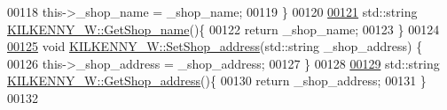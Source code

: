 \begin{DoxyCode}
00118     this->\_shop\_name = \_shop\_name;
00119 \}
00120 
\hypertarget{_k_i_l_k_e_n_n_y___w_8cpp_source.tex_l00121}{}\hyperlink{class_k_i_l_k_e_n_n_y___w_a93dac05f03edc97797f89501aa2af73a}{00121} std::string \hyperlink{class_k_i_l_k_e_n_n_y___w_a93dac05f03edc97797f89501aa2af73a}{KILKENNY\_W::GetShop\_name}()\{
00122     \textcolor{keywordflow}{return} \_shop\_name;
00123 \}
00124 
\hypertarget{_k_i_l_k_e_n_n_y___w_8cpp_source.tex_l00125}{}\hyperlink{class_k_i_l_k_e_n_n_y___w_ac4ec867027aed72ff28bfe667da084cd}{00125} \textcolor{keywordtype}{void} \hyperlink{class_k_i_l_k_e_n_n_y___w_ac4ec867027aed72ff28bfe667da084cd}{KILKENNY\_W::SetShop\_address}(std::string \_shop\_address) \{
00126     this->\_shop\_address = \_shop\_address;
00127 \}
00128 
\hypertarget{_k_i_l_k_e_n_n_y___w_8cpp_source.tex_l00129}{}\hyperlink{class_k_i_l_k_e_n_n_y___w_ad35a9d60fff2a3c1088f93ff04e6d9d4}{00129} std::string \hyperlink{class_k_i_l_k_e_n_n_y___w_ad35a9d60fff2a3c1088f93ff04e6d9d4}{KILKENNY\_W::GetShop\_address}()\{
00130     \textcolor{keywordflow}{return} \_shop\_address;
00131 \}
00132 
\end{DoxyCode}
